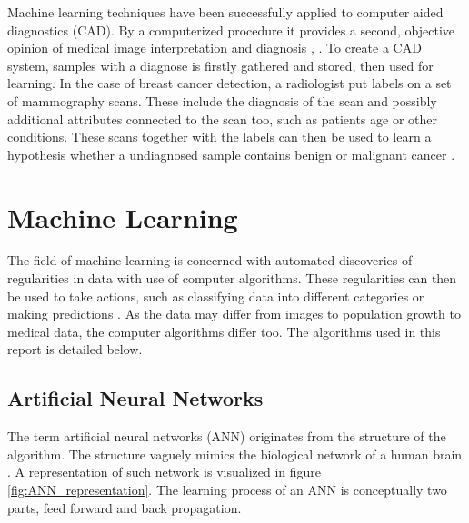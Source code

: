 Machine learning techniques have been successfully applied to computer aided diagnostics (CAD). By a computerized procedure it provides a second, objective opinion of medical image interpretation and diagnosis \parencite{li2007}, \parencite{ni2016}. To create a CAD system, samples with a diagnose is firstly gathered and stored, then used for learning. In the case of breast cancer detection, a radiologist put labels on a set of mammography scans. These include the diagnosis of the scan and possibly additional attributes connected to the scan too, such as patients age or other conditions. These scans together with the labels can then be used to learn a hypothesis whether a undiagnosed sample contains benign or malignant cancer \parencite{li2007}.


\section{Machine Learning}

The field of machine learning is concerned with automated discoveries of regularities in data with use of computer algorithms. These regularities can then be used to take actions, such as classifying data into different categories or making predictions \parencite{Bishop:2006}. As the data may differ from images to population growth to medical data, the computer algorithms differ too. The algorithms used in this report is detailed below.

\subsection{Artificial Neural Networks}

The term artificial neural networks (ANN) originates from the structure of the algorithm. The structure vaguely mimics the biological network of a human brain \parencite{Bishop:2006}. A representation of such network is visualized in figure \ref{fig:ANN_representation}. The learning process of an ANN is conceptually two parts, feed forward and back propagation.

